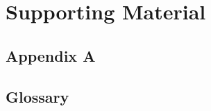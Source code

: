 \chapter{Supporting Material}
\label{app:supporting}


\section{Appendix A}
\lipsum[1]

\section{Glossary}
\label{app:glossary}
\lipsum[2]


\lipsum[1]

